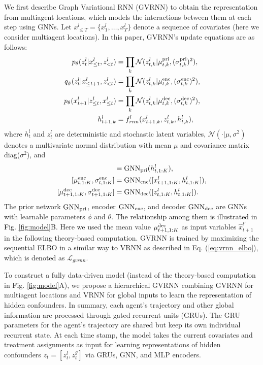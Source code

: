 \documentclass[journal]{IEEEtran}
\newcommand{\eq}[1]{\begin{align}#1\end{align}}
\begin{document}
We first describe Graph Variational RNN (GVRNN) \cite{Yeh19} to obtain the representation from multiagent locations, which models the interactions between them at each step using GNNs. 
Let $x^l_{\leq T} = \{ x^l_1, \dots, x^l_T \}$ denote a sequence of covariates (here we consider multiagent locations). 
In this paper, GVRNN's update equations are as follows:
%
\eq{
p_{\theta}(z^l_t | x^l_{\leq t}, z^l_{<t}) & = \prod_k \mathcal{N}(z^l_{t,k}|\mu^{\rm{pri}}_{t,k},(\sigma^{\rm{pri}}_{t,k})^2), \\
q_{\phi}(z^l_t | x^l_{\leq t+1}, z^l_{<t}) & = \prod_k \mathcal{N}(z^l_{t,k}|\mu^{\rm{enc}}_{t,k},(\sigma^{\rm{enc}}_{t,k})^2),\\
p_{\theta}(x^l_{t+1} | z^l_{\leq t}, x^l_{\leq t}) & = \prod_k \mathcal{N}(z^l_{t,k}|\mu^{\rm{dec}}_{t,k},(\sigma^{\rm{dec}}_{t,k})^2),\\
h^l_{t+1,k} & = f^l_{rnn}(x^l_{t+1,k}, z^l_{t,k}, h^l_{t,k}),
\label{eq:gvrnn_state}
}
%
where $h^l_t$ and $z^l_t$ are deterministic and stochastic latent variables, $\mathcal{N}(\cdot|\mu,\sigma^2)$ denotes a multivariate normal distribution with mean $\mu$ and covariance matrix diag($\sigma^2$), and
%
\eq{
[\mu^{\rm{pri}}_{t,1:K},\sigma^{\rm{pri}}_{t,1:K}] & = {\rm{GNN_{pri}}}(h^l_{t,1:K}),\\
[\mu^{\rm{enc}}_{t,1:K},\sigma^{\rm{enc}}_{t,1:K}] & = {\rm{GNN_{enc}}}([x^l_{t+1,1:K},h^l_{t,1:K}]), \\
[\mu^{\rm{dec}}_{t+1,1:K},\sigma^{\rm{dec}}_{t+1,1:K}] & = {\rm{GNN_{dec}}}([z^l_{t,1:K},h^l_{t,1:K}]).
}
%
The prior network ${\rm{GNN_{pri}}}$, encoder ${\rm{GNN_{enc}}}$, and decoder ${\rm{GNN_{dec}}}$ are GNNs with learnable parameters $\phi$ and $\theta$.
\textcolor{black}{The relationship among them is illustrated in Fig. \ref{fig:model}B.}
Here we used the mean value $\mu^{\rm{dec}}_{t+1,1:K}$ as input variables $\hat{x}^{l'}_{t+1}$ in the following theory-based computation.
GVRNN is trained by maximizing the sequential ELBO in a similar way to VRNN as described in Eq. (\ref{eq:vrnn_elbo}), which is denoted as $\mathcal{L}_{gvrnn}$.

To construct a fully data-driven model (instead of the theory-based computation in Fig. \ref{fig:model}A), we propose a hierarchical GVRNN combining GVRNN for multiagent locations and VRNN for global inputs to learn the representation of hidden confounders.
In summary, each agent’s trajectory and other global information are processed through gated recurrent units (GRUs). 
The GRU parameters for the agent's trajectory are shared but keep its own individual recurrent state. 
At each time stamp, the model takes the current covariates and treatment assignments as input for learning representations of hidden confounders $z_t = [z^l_t,z^g_t]$ via GRUs, GNN, and MLP encoders. 
\end{document}
